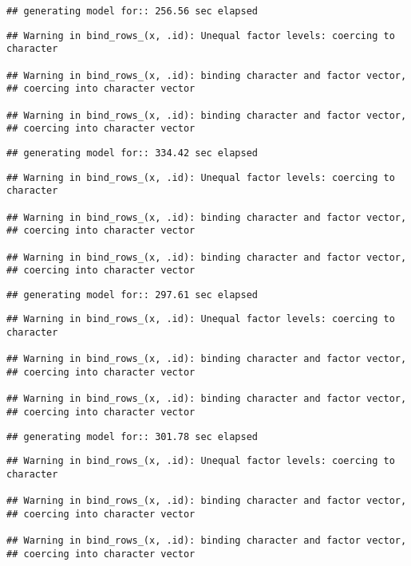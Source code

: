 \documentclass[]{article}
\begin{document}
\begin{verbatim}
## generating model for:: 256.56 sec elapsed
\end{verbatim}

\begin{verbatim}
## Warning in bind_rows_(x, .id): Unequal factor levels: coercing to character

## Warning in bind_rows_(x, .id): binding character and factor vector,
## coercing into character vector

## Warning in bind_rows_(x, .id): binding character and factor vector,
## coercing into character vector
\end{verbatim}

\begin{verbatim}
## generating model for:: 334.42 sec elapsed
\end{verbatim}

\begin{verbatim}
## Warning in bind_rows_(x, .id): Unequal factor levels: coercing to character

## Warning in bind_rows_(x, .id): binding character and factor vector,
## coercing into character vector

## Warning in bind_rows_(x, .id): binding character and factor vector,
## coercing into character vector
\end{verbatim}

\begin{verbatim}
## generating model for:: 297.61 sec elapsed
\end{verbatim}

\begin{verbatim}
## Warning in bind_rows_(x, .id): Unequal factor levels: coercing to character

## Warning in bind_rows_(x, .id): binding character and factor vector,
## coercing into character vector

## Warning in bind_rows_(x, .id): binding character and factor vector,
## coercing into character vector
\end{verbatim}

\begin{verbatim}
## generating model for:: 301.78 sec elapsed
\end{verbatim}

\begin{verbatim}
## Warning in bind_rows_(x, .id): Unequal factor levels: coercing to character

## Warning in bind_rows_(x, .id): binding character and factor vector,
## coercing into character vector

## Warning in bind_rows_(x, .id): binding character and factor vector,
## coercing into character vector
\end{verbatim}
\end{document}
